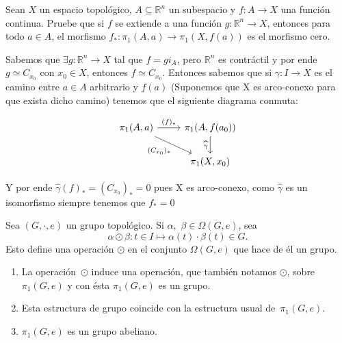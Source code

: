\documentclass[11pt]{article}
\newcommand{\R}{{\mathbb{R}}}
\newenvironment{proof}[1][Demostraci\'on]{\begin{trivlist}
\item[\hskip \labelsep {\bfseries #1}]}{\end{trivlist}}
\def \be{\begin{enumerate}}
\def \en{\end{enumerate}}
\begin{document}
\begin{enumerate}
\item Sean $X$ un espacio topol\'ogico, $A\subseteq \R^ n$ un subespacio y 
$f:A\rightarrow X$ una funci\'on continua. Pruebe que si $f$ se extiende a una
 funci\'on $g:\R^ n \rightarrow X$, entonces para todo $a\in A$, el morfismo $f_*:
 \pi_1(A,a)\rightarrow \pi_1(X,f(a))$ es el morfismo cero.

\begin{proof}

Sabemos que $\exists g:\R^n \rightarrow X$ tal que $f=gi_A$, pero $\R^n$ es contr\'actil y por ende $g \simeq C_{x_0}$ con $x_0 \in X$, entonces $f \simeq C_{x_0}$. Entonces sabemos que si $\gamma :I \rightarrow X$ es el camino entre $a \in A$ arbitrario y $f(a)$ (Suponemos que X es arco-conexo para que exista dicho camino) tenemos que el siguiente diagrama conmuta:

\[
\begin{tikzcd}
\pi_1(A,a)  \arrow{r}{(f)_*} \arrow[swap]{dr}{(C_{x_0})_*} & \pi_1(A,f(a_0)) \arrow[swap]{d}{\widehat{\gamma}} \\ \quad
& \pi_1(X,x_0)
\end{tikzcd}
\]

Y por ende $\widehat{\gamma}(f)_* =(C_{x_0})_* = 0 $ pues X es arco-conexo, como $\widehat{\gamma}$ es un isomorfismo siempre tenemos que $f_* = 0$

\end{proof}

 
\item Sea $(G,\mathord\cdot,e)$ un grupo topol\'ogico. Si $\alpha$,~$\beta\in
\Omega(G,e)$, sea 
  \[
  \alpha\odot\beta:t\in I\mapsto \alpha(t)\cdot\beta(t)\in G.
  \]
Esto define una operaci\'on $\odot$ en el conjunto $\Omega(G,e)$ que hace de
\'el un grupo.
\be

\item La operaci\'on~$\odot$ induce una operaci\'on, que tambi\'en notamos
$\odot$, sobre $\pi_1(G,e)$ y con \'esta $\pi_1(G,e)$ es un grupo.

\item Esta estructura de grupo coincide con la estructura usual
de~$\pi_1(G,e)$.

\item $\pi_1(G,e)$ es un grupo abeliano.

\en

\end{enumerate}
\end{document}
